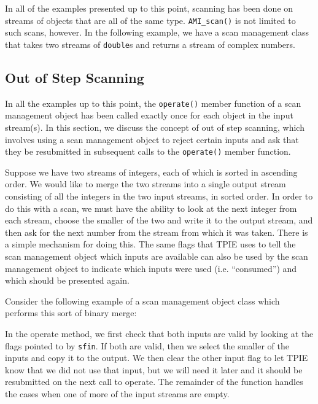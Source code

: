 
In all of the examples presented up to this point, scanning has been
done on streams of objects that are all of the same type.
\lstinline|AMI_scan()| is not limited to such scans, however.  In the
following example, we have a scan management class that takes two
streams of \lstinline|double|s and returns a stream of complex
numbers.



\subsection{Out of Step Scanning}

 In all the examples up to this point,
the \lstinline|operate()| member function of a scan management object
has been called exactly once for each object in the input stream(s).
In this section, we discuss the concept of out of step scanning, which
involves using a scan management object to reject certain inputs and
ask that they be resubmitted in subsequent calls to the
\lstinline|operate()| member function.

Suppose we have two streams of integers, each of which is sorted in
ascending order.  We would like to merge the two streams into a single
output stream consisting of all the integers in the two input streams,
in sorted order.  In order to do this with a scan, we must have the
ability to look at the next integer from each stream, choose the
smaller of the two and write it to the output stream, and then ask for
the next number from the stream from which it was taken.  There is a
simple mechanism for doing this.  The same flags that TPIE uses to
tell the scan management object which inputs are available can also be
used by the scan management object to indicate which inputs were used
(i.e. ``consumed'') and which should be presented again.

Consider the following example of a scan management object class which
performs this sort of binary merge:



In the operate method, we first check that both inputs are valid by
looking at the flags pointed to by \lstinline|sfin|.  If both are
valid, then we select the smaller of the inputs and copy it to the
output.  We then clear the other input flag to let TPIE know that we
did not use that input, but we will need it later and it should be
resubmitted on the next call to operate. The remainder of the function
handles the cases when one of more of the input streams are empty.
 


